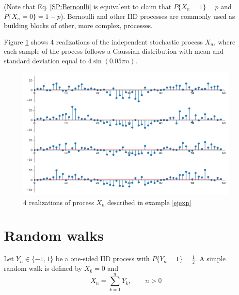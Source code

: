 (Note that Eq. \eqref{SP:Bernoulli} is equivalent to claim that $P\{X_n=1\} = p$ and $P\{X_n=0\} = 1-p$). Bernoulli and other IID processes are commonly used as building blocks of other, more complex, processes.

\begin{example}
\label{ejexp}
Figure \ref{fig:noisy_sin} shows 4 realizations of the independent stochastic process $X_n$, where each sample of the process follows a Gaussian distribution with mean and standard deviation equal to $4 \sin\left(0.05 \pi n \right)$. 
\end{example}

  
\begin{figure}[htb]
\begin{center}
\includegraphics[width=12cm]{Figures/sp_noisy_sin.png} 
\caption{4 realizations of process $X_n$ described in example \ref{ejexp}}
      \label{fig:noisy_sin}
  \end{center}
\end{figure}



\section{Random walks}

\begin{definition}
Let $Y_n \in \{-1, 1\}$ be a one-sided IID process with $P\{Y_n= 1\}=\frac{1}{2}$. A simple random walk is defined by $X_0 = 0$ and
\begin{equation}
X_n = \sum_{k=1}^{n} Y_k,    \qquad n>0
\label{sp:srw_def}
\end{equation}

\end{definition}


